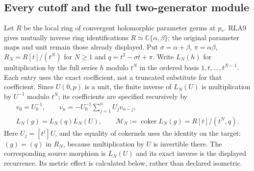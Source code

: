 \documentclass[11pt]{article}
\begin{document}
\subsection{Every cutoff and the full two-generator module}

Let $R$ be the local ring of convergent holomorphic parameter germs
at $p_*$.  RLA9 gives mutually inverse ring identifications
$R\simeq\mathbb C\{\alpha,\beta\}$; the original parameter maps and
unit remain those already displayed.  Put $\sigma=\alpha+\beta$,
$\pi=\alpha\beta$, $R_N=R[t]/(t^N)$ for $N\ge1$ and
$q=t^2-\sigma t+\pi$.  Write $L_N(h)$ for multiplication by the
full series $h$ modulo $t^N$ in the ordered basis $1,t,\ldots,t^{N-1}$.
Each entry uses the exact coefficient, not a truncated substitute
for that coefficient.  Since $U(0,p)$ is a unit, the finite inverse
of $L_N(U)$ is multiplication by $U^{-1}$ modulo $t^N$; its
coefficients are specified recursively by
\[
 \begin{gathered}v_0=U_0^{-1},\qquad
 v_n=-U_0^{-1}\sum_{j=1}^nU_jv_{n-j},\\
 L_N(g)=L_N(q)L_N(U),\qquad
 \mathcal M_N:=\operatorname{coker}L_N(g)=R[t]/(t^N,q).
 \end{gathered}\tag{RLA11}
\]
Here $U_j=[t^j]U$, and the equality of cokernels uses the identity on
the target: $(g)=(q)$ in $R_N$, because multiplication by $U$ is
invertible there.  The corresponding source morphism is $L_N(U)$
and its exact inverse is the displayed recurrence.  Its metric
effect is calculated below, rather than declared isometric.
\end{document}
